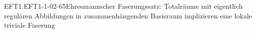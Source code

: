 \begin{PROP}{EFT1.EFT1-1-02-65}{Ehresmannscher Faserungssatz: Totalräume mit eigentlich regulären Abbildungen in zusammenhängenden Basisraum implizieren eine lokale triviale Faserung}

\end{PROP}
